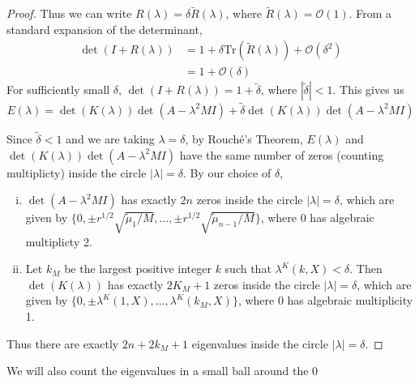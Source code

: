 \documentclass[thesis.tex]{subfiles}
\begin{document}
\begin{lemma}
\begin{proof}
Thus we can write $R(\lambda) = \delta \tilde{R}(\lambda)$, where $\tilde{R}(\lambda) = \mathcal{O}(1)$. From a standard expansion of the determinant, 
\begin{align*}
\det(I + R(\lambda)) &= 1 + \delta \text{Tr}(\tilde{R}(\lambda)) + \mathcal{O}(\delta^2) \\
&= 1 + \mathcal{O}(\delta)
\end{align*}
For sufficiently small $\delta$, $\det(I + R(\lambda)) = 1 + \tilde{\delta}$, where $|\tilde{\delta}| < 1$. This gives us 
\begin{equation}
E(\lambda) = \det(K(\lambda))\det(A - \lambda^2 MI) + \tilde{\delta} \det(K(\lambda))\det(A - \lambda^2 MI)
\end{equation}

Since $\tilde{\delta} < 1$ and we are taking $\lambda = \delta$, by Rouch\'e's Theorem, $E(\lambda)$ and $\det(K(\lambda))\det(A - \lambda^2 MI)$ have the same number of zeros (counting multiplicty) inside the circle $|\lambda| = \delta$. By our choice of $\delta$, 
\begin{enumerate}[(i)]
\item $\det(A - \lambda^2 MI)$ has exactly $2n$ zeros inside the circle $|\lambda| = \delta$, which are given by $\{ 0, \pm r^{1/2} \sqrt{ \tilde{\mu}_1 /M}, \dots, \pm r^{1/2} \sqrt{\tilde{\mu}_{n-1}/M} \}$, where 0 has algebraic multiplicty 2.

\item Let $k_M$ be the largest positive integer $k$ such that $\lambda^K(k,X) < \delta$. Then $\det(K(\lambda))$ has exactly $2 K_M + 1$ zeros inside the circle $|\lambda| = \delta$, which are given by $\{0, \pm \lambda^K(1,X), \dots, \lambda^K(k_M,X)\}$, where 0 has algebraic multiplicity 1.
\end{enumerate}

Thus there are exactly $2n + 2 k_M + 1$ eigenvalues inside the circle $|\lambda| = \delta$. 
\end{proof}
\end{lemma}

We will also count the eigenvalues in a small ball around the 0 
\end{document}
